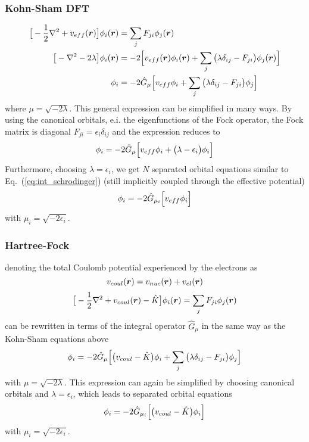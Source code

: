 \subsubsection{Kohn-Sham DFT}
\begin{align}
    \big[-\frac{1}{2}\nabla^2+v_{eff}(\boldsymbol r)\big]\phi_i(\boldsymbol r) 
	    &= \sum_j F_{ji} \phi_j(\boldsymbol r)\\
    \big[-\nabla^2 - 2\lambda\big]\phi_i(\boldsymbol r) &= -2\Big[v_{eff}(\boldsymbol r) \phi_i(\boldsymbol r)
	    + \sum_j \big(\lambda\delta_{ij} - F_{ji}\big) \phi_j(\boldsymbol r)\Big]\\
    \phi_i &= -2\hat{G}_\mu\Big[v_{eff} \phi_i + 
	\sum_j \big(\lambda\delta_{ij} - F_{ji}\big) \phi_j\Big]
\end{align}
where $\mu = \sqrt{-2\lambda}$. This general expression can be simplified in many ways.
By using the canonical orbitals, e.i. the eigenfunctions of the Fock operator, the 
Fock matrix is diagonal $F_{ji} = \epsilon_i\delta_{ij}$ and the expression reduces to
\begin{equation}
    \phi_i = -2\hat{G}_\mu\Big[v_{eff} \phi_i + 
	\big(\lambda - \epsilon_{i}\big) \phi_i\Big]
\end{equation}
Furthermore, choosing $\lambda = \epsilon_i$, we get $N$ separated orbital equations similar 
to Eq.~(\ref{eq:int_schrodinger}) (still implicitly coupled through the effective potential)
\begin{equation}
    \phi_i = -2 \hat{G}_{\mu_i}\Big[v_{eff}\phi_i\Big]
\end{equation}
with $\mu_i = \sqrt{-2\epsilon_i}$.

\subsubsection{Hartree-Fock}
denoting the total Coulomb potential experienced by the electrons as
\begin{equation}
    v_{coul}(\boldsymbol r) = v_{nuc}(\boldsymbol r) + v_{el}(\boldsymbol r)
\end{equation}
\begin{equation}
    \big[-\frac{1}{2}\nabla^2+v_{coul}(\boldsymbol r)-\hat{K}\big]\phi_i(\boldsymbol r) 
	    = \sum_j F_{ji} \phi_j(\boldsymbol r)
\end{equation}
can be rewritten in terms of the integral operator $\hat{G}_\mu$ in the same way as the Kohn-Sham
equations above
\begin{equation}
    \phi_i = -2\hat{G}_\mu\Big[\big(v_{coul} - \hat{K}\big)\phi_i + 
	\sum_j \big(\lambda\delta_{ij} - F_{ji}\big) \phi_j\Big]
\end{equation}
with $\mu = \sqrt{-2\lambda}$. This expression can again be simplified by choosing
canonical orbitals and $\lambda = \epsilon_i$, which leads to separated orbital equations
\begin{equation}
    \phi_i = -2 \hat{G}_{\mu_i}\Big[\big(v_{coul} - \hat{K}\big)\phi_i\Big]
\end{equation}
with $\mu_i = \sqrt{-2\epsilon_i}$.

